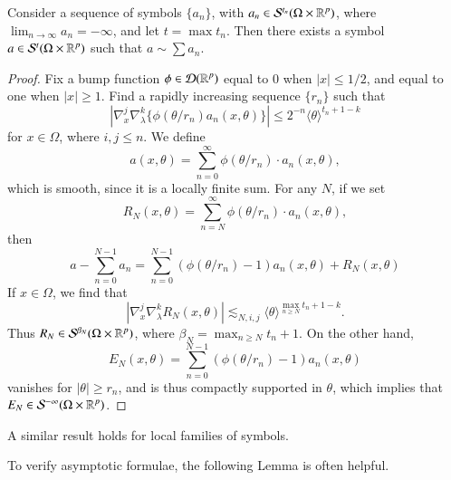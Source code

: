 \begin{theorem}
    Consider a sequence of symbols $\{ a_n \}$, with $a_n \in \mathcal{S}^{t_n}(\Omega \times \operatorname{\mathbb{R}}^p)$, where $\lim_{n \to \infty} a_n = -\infty$, and let $t = \max t_n$. Then there exists a symbol $a \in \mathcal{S}^t(\Omega \times \operatorname{\mathbb{R}}^p)$ such that $a \sim \sum a_n$.
\end{theorem}
\begin{proof}
    Fix a bump function $\phi \in \operatorname{\mathcal{D}}(\operatorname{\mathbb{R}}^p)$ equal to 0 when $|x| \leq 1/2$, and equal to one when $|x| \geq 1$. Find a rapidly increasing sequence $\{ r_n \}$ such that
    \[ | \nabla_x^j \nabla_\lambda^k \{ \phi( \theta / r_n ) a_n(x,\theta) \} | \leq 2^{-n} \langle \theta \rangle^{t_n + 1 - k} \]
    for $x \in \Omega$, where $i,j \leq n$. We define
    \[ a(x,\theta) = \sum_{n = 0}^\infty \phi(\theta / r_n) \cdot a_n(x,\theta), \]
    which is smooth, since it is a locally finite sum. For any $N$, if we set
    \[ R_N(x,\theta) = \sum_{n = N}^\infty \phi(\theta / r_n) \cdot a_n(x,\theta), \]
    then
    \[ a - \sum_{n = 0}^{N-1} a_n = \sum_{n = 0}^{N-1} (\phi(\theta/r_n) - 1) a_n(x,\theta) + R_N(x,\theta) \]
    If $x \in \Omega$, we find that
    \[ | \nabla_x^j \nabla_\lambda^k R_N(x,\theta) | \lesssim_{N,i,j} \langle \theta \rangle^{\max_{n \geq N} t_n + 1 - k}. \]
    Thus $R_N \in \mathcal{S}^{\beta_N}(\Omega \times \operatorname{\mathbb{R}}^p)$, where $\beta_N = \max_{n \geq N} t_n + 1$. On the other hand,
    \[ E_N(x,\theta) = \sum_{n = 0}^{N-1} (\phi(\theta/r_n) - 1) a_n(x,\theta) \]
    vanishes for $|\theta| \geq r_n$, and is thus compactly supported in $\theta$, which implies that $E_N \in \mathcal{S}^{-\infty}(\Omega \times \operatorname{\mathbb{R}}^p)$.
\end{proof}

\begin{remark}
    A similar result holds for local families of symbols.
\end{remark}

To verify asymptotic formulae, the following Lemma is often helpful.

